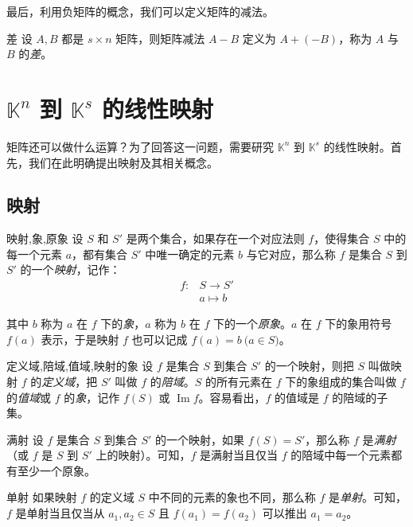 最后，利用负矩阵的概念，我们可以定义矩阵的减法。

\begin{definition}{差}
	设 $A, B$ 都是 $s \times n$ 矩阵，则矩阵减法 $A - B$ 定义为 $A + (-B)$，称为 $A$ 与 $B$ 的\emph{差}。
\end{definition}

\section{$\mathbb K^n$ 到 $\mathbb K^s$ 的线性映射}

矩阵还可以做什么运算？为了回答这一问题，需要研究 $\mathbb K^n$ 到 $\mathbb K^s$ 的线性映射。首先，我们在此明确提出映射及其相关概念。

\subsection{映射}

\begin{definition}{映射,象,原象}
	设 $S$ 和 $S'$ 是两个集合，如果存在一个对应法则 $f$，使得集合 $S$ 中的每一个元素 $a$，都有集合 $S'$ 中唯一确定的元素 $b$ 与它对应，那么称 $f$ 是集合 $S$ 到 $S'$ 的一个\emph{映射}，记作：
	$$
	\begin{aligned}
		f \colon & S \to S'
		\\&
		a \mapsto b
	\end{aligned}
	$$

	其中 $b$ 称为 $a$ 在 $f$ 下的\emph{象}，$a$ 称为 $b$ 在 $f$ 下的一个\emph{原象}。$a$ 在 $f$ 下的象用符号 $f(a)$ 表示，于是映射 $f$ 也可以记成 $f(a) = b \pod{a \in S}$。
\end{definition}

\begin{definition}{定义域,陪域,值域,映射的象}
	设 $f$ 是集合 $S$ 到集合 $S'$ 的一个映射，则把 $S$ 叫做映射 $f$ 的\emph{定义域}，把 $S'$ 叫做 $f$ 的\emph{陪域}。$S$ 的所有元素在 $f$ 下的象组成的集合叫做 $f$ 的\emph{值域}或 $f$ 的\emph{象}，记作 $f(S)$ 或 $\operatorname{Im} f$。容易看出，$f$ 的值域是 $f$ 的陪域的子集。
\end{definition}

\begin{definition}{满射}
	设 $f$ 是集合 $S$ 到集合 $S'$ 的一个映射，如果 $f(S) = S'$，那么称 $f$ 是\emph{满射}（或 $f$ 是 $S$ 到 $S'$ 上的映射）。可知，$f$ 是满射当且仅当 $f$ 的陪域中每一个元素都有至少一个原象。
\end{definition}

\begin{definition}{单射}
	如果映射 $f$ 的定义域 $S$ 中不同的元素的象也不同，那么称 $f$ 是\emph{单射}。可知，$f$ 是单射当且仅当从 $a_1, a_2 \in S$ 且 $f(a_1) = f(a_2)$ 可以推出 $a_1 = a_2$。
\end{definition}

